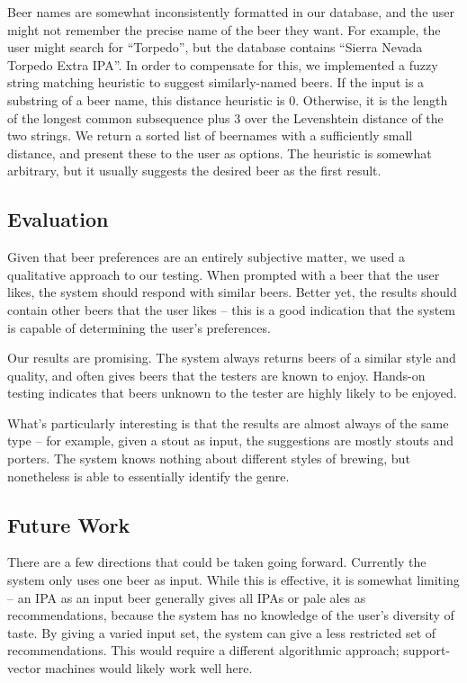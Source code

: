 \documentclass[11pt]{article}
\begin{document}
\begin{itemize}
  Beer names are somewhat inconsistently formatted in our database, and the user might not remember the precise name of the beer they want. For example, the user might search for ``Torpedo'', but the database contains ``Sierra Nevada Torpedo Extra IPA''. In order to compensate for this, we implemented a fuzzy string matching heuristic to suggest similarly-named beers. If the input is a substring of a beer name, this distance heuristic is 0. Otherwise, it is the length of the longest common subsequence plus 3 over the Levenshtein distance of the two strings. We return a sorted list of beernames with a sufficiently small distance, and present these to the user as options. The heuristic is somewhat arbitrary, but it usually suggests the desired beer as the first result.
\end{itemize}
\subsection*{Evaluation}
Given that beer preferences are an entirely subjective matter, we used a qualitative approach to our testing. When prompted with a beer that the user likes, the system should respond with similar beers. Better yet, the results should contain other beers that the user likes -- this is a good indication that the system is capable of determining the user's preferences.


Our results are promising. The system always returns beers of a similar style and quality, and often gives beers that the testers are known to enjoy. Hands-on testing indicates that beers unknown to the tester are highly likely to be enjoyed.

What's particularly interesting is that the results are almost always of the same type -- for example, given a stout as input, the suggestions are mostly stouts and porters. The system knows nothing about different styles of brewing, but nonetheless is able to essentially identify the genre.
\subsection*{Future Work}
There are a few directions that could be taken going forward. Currently the system only uses one beer as input. While this is effective, it is somewhat limiting -- an IPA as an input beer generally gives all IPAs or pale ales as recommendations, because the system has no knowledge of the user's diversity of taste. By giving a varied input set, the system can give a less restricted set of recommendations. This would require a different algorithmic approach; support-vector machines would likely work well here.
\end{document}
